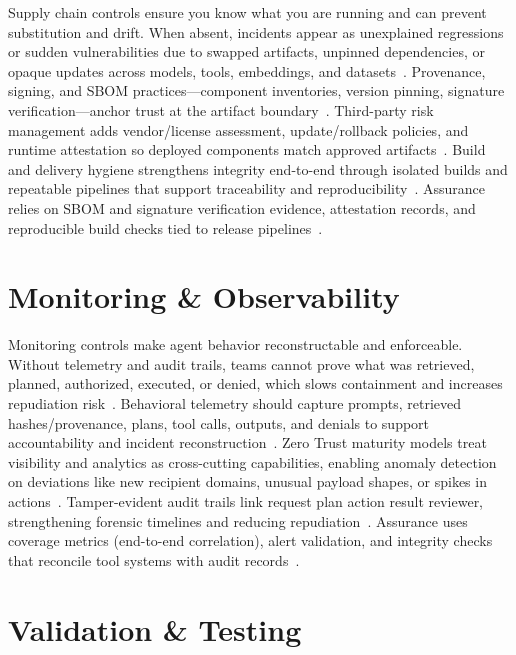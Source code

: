 \begin{TNtwocol}
  Supply chain controls ensure you know what you are running and can prevent substitution and drift. When absent, incidents appear as unexplained regressions or sudden vulnerabilities due to swapped artifacts, unpinned dependencies, or opaque updates across models, tools, embeddings, and datasets~\cite{nist-sp800-218,nist-sp800-53b}. Provenance, signing, and SBOM practices—component inventories, version pinning, signature verification—anchor trust at the artifact boundary~\cite{nist-sp800-218,nist-sp800-53b}. Third-party risk management adds vendor/license assessment, update/rollback policies, and runtime attestation so deployed components match approved artifacts~\cite{nist-sp800-218,nist-airmf-100-1}. Build and delivery hygiene strengthens integrity end-to-end through isolated builds and repeatable pipelines that support traceability and reproducibility~\cite{nist-sp800-218,nist-sp800-53b}. Assurance relies on SBOM and signature verification evidence, attestation records, and reproducible build checks tied to release pipelines~\cite{nist-sp800-218,nist-sp800-53b}.

  \section{Monitoring \& Observability}

  Monitoring controls make agent behavior reconstructable and enforceable. Without telemetry and audit trails, teams cannot prove what was retrieved, planned, authorized, executed, or denied, which slows containment and increases repudiation risk~\cite{nist-airmf-100-1,nist-sp800-53b}. Behavioral telemetry should capture prompts, retrieved hashes/provenance, plans, tool calls, outputs, and denials to support accountability and incident reconstruction~\cite{nist-airmf-100-1,nist-sp800-53b}. Zero Trust maturity models treat visibility and analytics as cross-cutting capabilities, enabling anomaly detection on deviations like new recipient domains, unusual payload shapes, or spikes in actions~\cite{cisa-ztmm-v2,nist-sp800-207,owasp-top10-llm-2025}. Tamper-evident audit trails link request  \rightarrow  plan  \rightarrow  action  \rightarrow  result  \rightarrow  reviewer, strengthening forensic timelines and reducing repudiation~\cite{nist-sp800-53b,nist-airmf-100-1}. Assurance uses coverage metrics (end-to-end correlation), alert validation, and integrity checks that reconcile tool systems with audit records~\cite{cisa-ztmm-v2,nist-sp800-53b}.

  \section{Validation \& Testing}


\end{TNtwocol}
